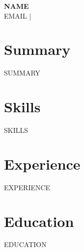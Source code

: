 \documentclass{article}
\begin{document}
\begin{center}
  {\LARGE \textbf{{{NAME}}}} \\
  \vspace{2mm}
  {{EMAIL}} \quad |  \\
\end{center}

\section*{Summary}
{{SUMMARY}}

\section*{Skills}
{{SKILLS}}

\section*{Experience}
{{EXPERIENCE}}

\section*{Education}
{{EDUCATION}}
\end{document}
